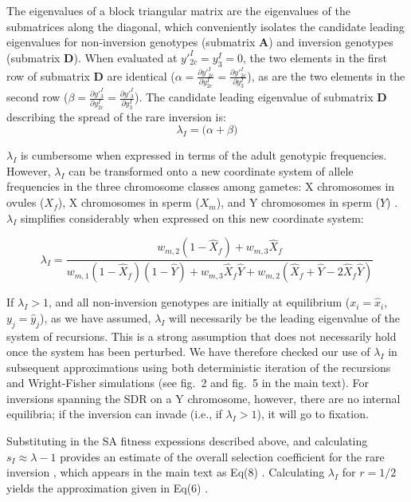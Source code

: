 \documentclass{article}
\newcommand\hl[1]{%
  \bgroup
  \hskip0pt\color{blue!80!black}%
  #1%
  \egroup
}
\begin{document}
\noindent The eigenvalues of a block triangular matrix are the eigenvalues of the submatrices along the diagonal, which conveniently isolates the candidate leading eigenvalues for non-inversion genotypes (submatrix $\mathbf{A}$) and inversion genotypes (submatrix $\mathbf{D}$). When evaluated at $y'^I_{2c} = y^I_{3} = 0$, the two elements in the first row of submatrix $\mathbf{D}$ are identical ($ \alpha = \frac{\partial y'^I_{2c}}{\partial y^I_{2c}} = \frac{\partial y'^I_{2c}}{\partial y^I_{3}}$), as are the two elements in the second row ($\beta = \frac{\partial y'^I_{3}}{\partial y^I_{2c}} = \frac{\partial y'^I_{3}}{\partial y^I_{3}}$). The candidate leading eigenvalue of submatrix $\mathbf{D}$ describing the spread of the rare inversion is:
\begin{equation}
	\lambda_{I} = \big( \alpha + \beta \big)
\end{equation}

\noindent $\lambda_I$ is cumbersome when expressed in terms of the adult genotypic frequencies. However, $\lambda_I$ can be transformed onto a new coordinate system of allele frequencies in the three chromosome classes among gametes: X chromosomes in ovules ($X_f$), X chromosomes in sperm ($X_m$), and Y chromosomes in sperm ($Y$) \citep{Clark1987,Otto2011,Otto2014}. $\lambda_I$ simplifies considerably when expressed on this new coordinate system:

\begin{equation}
	\lambda_I = \frac{w_{m,2}(1 - \hat{X}_f) + w_{m,3} \hat{X}_f} {w_{m,1}(1 - \hat{X}_f)(1 - \hat{Y}) + w_{m,3} \hat{X}_f \hat{Y} + w_{m,2} (\hat{X}_f + \hat{Y} - 2 \hat{X}_f \hat{Y})}
\end{equation}

\noindent If $\lambda_I > 1$, and all non-inversion genotypes are initially at equilibrium ($x_i = \hat{x}_i$, $y_j = \hat{y}_j$), as we have assumed, $\lambda_I$ will necessarily be the leading eigenvalue of the system of recursions. This is a strong assumption that does not necessarily hold once the system has been perturbed. We have therefore checked our use of $\lambda_I$ in subsequent approximations using both deterministic iteration of the recursions and Wright-Fisher simulations (see fig.~2 and fig.~5 in the main text). For inversions spanning the SDR on a Y chromosome, however, there are no internal equilibria; if the inversion can invade (i.e., if $\lambda_I > 1$), it will go to fixation. 

Substituting in the SA fitness expessions described above, and calculating $s_I \approx \lambda - 1$ provides an estimate of the overall selection coefficient for the rare inversion \cite{OttoYong2002}, which appears in the main text as \hl{Eq(8)}. Calculating $\lambda_I$ for $r = 1/2$ yields the approximation given in \hl{Eq(6)}.
\end{document}
